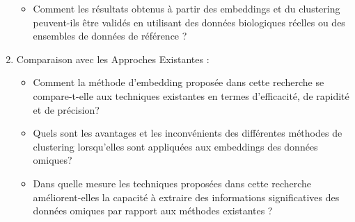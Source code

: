 \begin{enumerate}
\begin{itemize}
            \item  Comment les résultats obtenus à partir des embeddings et du clustering peuvent-ils être validés en utilisant des données biologiques réelles ou des ensembles de données de référence ?
    \end{itemize}
\item Comparaison avec les Approches Existantes :
     \begin{itemize}
              \item Comment la méthode d'embedding proposée dans cette recherche se compare-t-elle aux techniques existantes en termes d'efficacité, de rapidité et de précision?
             \item Quels sont les avantages et les inconvénients des différentes méthodes de clustering lorsqu'elles sont appliquées aux embeddings des données omiques?
              \item Dans quelle mesure les techniques proposées dans cette recherche améliorent-elles la capacité à extraire des informations significatives des données omiques par rapport aux méthodes existantes ? 
     \end{itemize}
\end{enumerate}